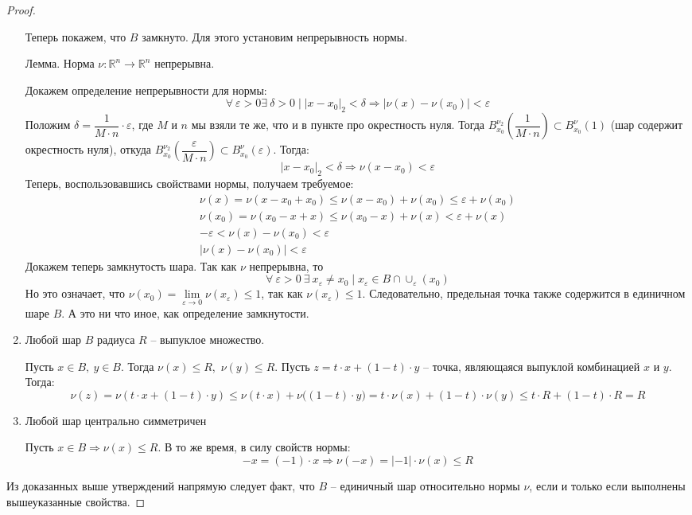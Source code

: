 \begin{proof}
\begin{enumerate}
        Теперь покажем, что $B$ замкнуто. Для этого установим непрерывность нормы.
        
        $\textbf{Лемма}$. Норма $\nu : \mathbb{R}^n \to \mathbb{R}^n$ непрерывна.
        
        Докажем определение непрерывности для нормы: 
        \[\forall\ \varepsilon > 0 \exists\ \delta > 0 \mid |x - x_0|_2 < \delta \Rightarrow |\nu(x) - \nu(x_0)| < \varepsilon\]
        Положим $\delta = \dfrac{1}{M \cdot n} \cdot \varepsilon$, где $M$ и $n$ мы взяли те же, что и в пункте про окрестность нуля. Тогда $B_{x_0}^{\nu_2}\left(\dfrac{1}{M \cdot n}\right) \subset B_{x_0}^{\nu}(1)$ (шар содержит окрестность нуля), откуда $B_{x_0}^{\nu_2}\left(\dfrac{\varepsilon}{M \cdot n}\right) \subset B_{x_0}^{\nu}(\varepsilon)$. Тогда:
        \[|x - x_0|_2 < \delta \Longrightarrow \nu(x - x_0) < \varepsilon\]
        Теперь, воспользовавшись свойствами нормы, получаем требуемое:
        \begin{gather*}
            \nu(x) = \nu(x - x_0 + x_0) \leqslant \nu(x - x_0) + \nu(x_0) \leqslant \varepsilon + \nu(x_0)\\
            \nu(x_0) = \nu(x_0 - x + x) \leqslant \nu(x_0 - x) + \nu(x) < \varepsilon + \nu(x)\\
            -\varepsilon < \nu(x) - \nu(x_0) < \varepsilon \\
            |\nu(x) - \nu(x_0)| < \varepsilon
        \end{gather*}
        Докажем теперь замкнутость шара. Так как $\nu$ непрерывна, то 
        \[\forall\ \varepsilon > 0\ \exists\ x_\varepsilon \neq x_0 \mid x_\varepsilon \in B \cap \cup_\varepsilon(x_0)\]
        Но это означает, что $\nu(x_0) = \displaystyle\lim\limits_{\varepsilon \to 0} \nu(x_\varepsilon) \leqslant 1$, так как $\nu(x_\varepsilon) \leqslant 1$. Следовательно, предельная точка также содержится в единичном шаре $B$.  А это ни что иное, как определение замкнутости.
        \item Любой шар $B$ радиуса $R$ -- выпуклое множество.
        
        Пусть $x \in B,\ y \in B$. Тогда $\nu(x) \leqslant R$,\ $\nu(y) \leqslant R$. Пусть $z = t \cdot x + (1 - t) \cdot y$ -- точка, являющаяся выпуклой комбинацией $x$ и $y$. Тогда:
        \[\nu(z) = \nu(t \cdot x + (1 - t) \cdot y) \leqslant \nu(t \cdot x) + \nu\big((1 - t) \cdot y\big) = t \cdot \nu (x) + (1 - t) \cdot \nu(y) \leqslant t \cdot R + (1 - t) \cdot R = R\]
        
        \item Любой шар центрально симметричен
        
        Пусть $x \in B \Rightarrow \nu(x) \leqslant R$. В то же время, в силу свойств нормы:
        \[-x = (-1) \cdot x \Rightarrow \nu(-x) = |-1| \cdot \nu(x) \leqslant R\] 
            
        \end{enumerate}
        
        Из доказанных выше утверждений напрямую следует факт, что $B$ -- единичный шар относительно нормы $\nu$, если и только если выполнены вышеуказанные свойства.
    
\end{proof}

